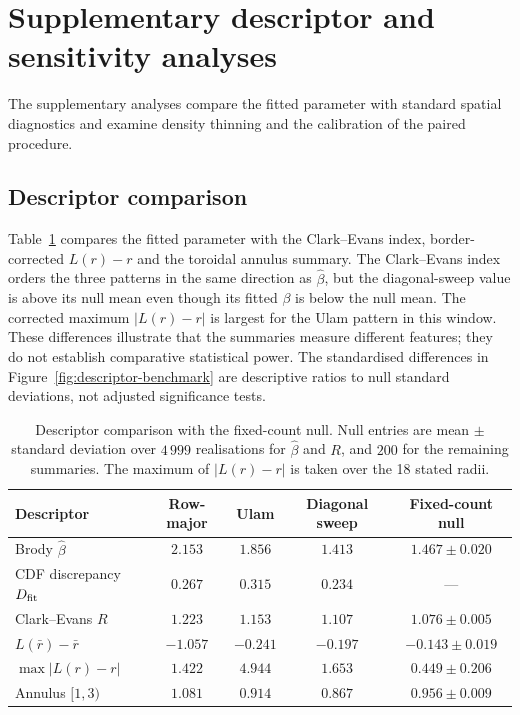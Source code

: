 \documentclass[final,1p,times,authoryear]{elsarticle}
\theoremstyle{definition}
\begin{document}
\clearpage
\setcounter{table}{0}
\setcounter{figure}{0}
\section{Supplementary descriptor and sensitivity analyses}
\label{app:supplementary}

The supplementary analyses compare the fitted parameter with standard spatial
diagnostics and examine density thinning and the
calibration of the paired procedure.

\subsection{Descriptor comparison}

Table~\ref{tab:descriptors} compares the fitted parameter with the
Clark--Evans index, border-corrected $L(r)-r$ and the toroidal annulus
summary. The Clark--Evans index orders the three patterns
in the same direction as $\hat\beta$, but the diagonal-sweep value is above
its null mean even though its fitted $\beta$ is below the null mean. The
corrected maximum $|L(r)-r|$ is largest for the Ulam pattern in this window.
These differences illustrate that the summaries measure different features;
they do not establish comparative statistical power. The standardised
differences in Figure~\ref{fig:descriptor-benchmark} are descriptive ratios
to null standard deviations, not adjusted significance tests.

\begin{table}[htbp]
  \centering
  \caption{Descriptor comparison with the fixed-count null. Null entries are
           mean $\pm$ standard deviation over $4\,999$ realisations for
           $\hat\beta$ and $R$, and $200$ for the remaining summaries. The
           maximum of $|L(r)-r|$ is taken over the 18 stated radii.}
  \label{tab:descriptors}
  \footnotesize
  \setlength{\tabcolsep}{3pt}
  \begin{tabular}{@{}lcccc@{}}
    \toprule
    Descriptor & Row-major & Ulam & Diagonal sweep & Fixed-count null \\
    \midrule
    Brody $\hat\beta$ & $2.153$ & $1.856$ & $1.413$ & $1.467\pm0.020$ \\
    CDF discrepancy $D_{\rm fit}$ & $0.267$ & $0.315$ & $0.234$ & --- \\
    Clark--Evans $R$ & $1.223$ & $1.153$ & $1.107$ & $1.076\pm0.005$ \\
    $L(\bar r)-\bar r$ & $-1.057$ & $-0.241$ & $-0.197$ & $-0.143\pm0.019$ \\
    $\max|L(r)-r|$ & $1.422$ & $4.944$ & $1.653$ & $0.449\pm0.206$ \\
    Annulus $[1,3)$ & $1.081$ & $0.914$ & $0.867$ & $0.956\pm0.009$ \\
    \bottomrule
  \end{tabular}
\end{table}
\end{document}
